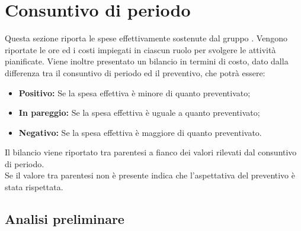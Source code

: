 \section{Consuntivo di periodo} \label{section:consuntivo}
Questa sezione riporta le spese effettivamente sostenute dal gruppo \groupName{}.
Vengono riportate le ore ed i costi impiegati in ciascun ruolo per svolgere le attività pianificate.
Viene inoltre presentato un bilancio in termini di costo, dato dalla differenza tra il consuntivo di periodo ed il preventivo, che potrà essere:
\begin{itemize}
  \item \textbf{Positivo:} Se la spesa effettiva è minore di quanto preventivato;
  \item \textbf{In pareggio:} Se la spesa effettiva è uguale a quanto preventivato;
  \item \textbf{Negativo:} Se la spesa effettiva è maggiore di quanto preventivato.
\end{itemize}
Il bilancio viene riportato tra parentesi a fianco dei valori rilevati dal consuntivo di periodo.\\
Se il valore tra parentesi non è presente indica che l'aspettativa del preventivo è stata rispettata.


\subsection{Analisi preliminare} \label{subsection:consuntivo_analisi}
